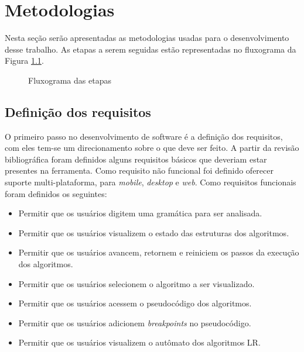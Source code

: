 \chapter{Metodologias}
\label{chap:metodologia}
Nesta seção serão apresentadas as metodologias usadas para o desenvolvimento desse trabalho. As etapas a serem seguidas estão representadas no fluxograma da Figura \ref{fig:etapas}.

\begin{figure}[ht]
  \centering
  \captionsetup{width=16cm}
  \caption{Fluxograma das etapas}
  \label{fig:etapas}
\end{figure}

\section{Definição dos requisitos}
O primeiro passo no desenvolvimento de software é a definição dos requisitos, com eles tem-se um direcionamento sobre o que deve ser feito. A partir da revisão bibliográfica foram definidos alguns requisitos básicos que deveriam estar presentes na ferramenta. Como requisito não funcional foi definido oferecer suporte multi-plataforma, para \textit{mobile}, \textit{desktop} e \textit{web}. Como requisitos funcionais foram definidos os seguintes:
\begin{itemize}[label={$\sbullet$}]
  \item Permitir que os usuários digitem uma gramática para ser analisada.
  \item Permitir que os usuários visualizem o estado das estruturas dos algoritmos.
  \item Permitir que os usuários avancem, retornem e reiniciem os passos da execução dos algoritmos.
  \item Permitir que os usuários selecionem o algoritmo a ser visualizado.
  \item Permitir que os usuários acessem o pseudocódigo dos algoritmos.
  \item Permitir que os usuários adicionem \textit{breakpoints} no pseudocódigo.
  \item Permitir que os usuários visualizem o autômato dos algoritmos LR.
\end{itemize}

